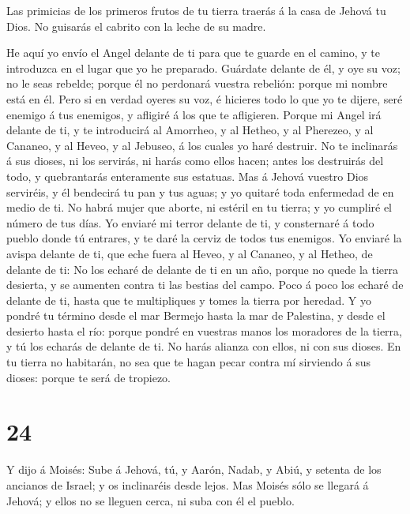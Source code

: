  Las primicias de los primeros frutos de tu tierra traerás
á la casa de Jehová tu Dios. No guisarás el cabrito con la leche de su
madre.

 He aquí yo envío el Angel delante de ti para que te guarde
en el camino, y te introduzca en el lugar que yo he preparado.
 Guárdate delante de él, y oye su voz; no le seas rebelde;
porque él no perdonará vuestra rebelión: porque mi nombre está en él.
 Pero si en verdad oyeres su voz, é hicieres todo lo que yo
te dijere, seré enemigo á tus enemigos, y afligiré á los que te
afligieren.  Porque mi Angel irá delante de ti, y te
introducirá al Amorrheo, y al Hetheo, y al Pherezeo, y al Cananeo, y al
Heveo, y al Jebuseo, á los cuales yo haré destruir.  No te
inclinarás á sus dioses, ni los servirás, ni harás como ellos hacen;
antes los destruirás del todo, y quebrantarás enteramente sus estatuas.
 Mas á Jehová vuestro Dios serviréis, y él bendecirá tu pan
y tus aguas; y yo quitaré toda enfermedad de en medio de ti.
 No habrá mujer que aborte, ni estéril en tu tierra; y yo
cumpliré el número de tus días.  Yo enviaré mi terror
delante de ti, y consternaré á todo pueblo donde tú entrares, y te daré
la cerviz de todos tus enemigos.  Yo enviaré la avispa
delante de ti, que eche fuera al Heveo, y al Cananeo, y al Hetheo, de
delante de ti:  No los echaré de delante de ti en un año,
porque no quede la tierra desierta, y se aumenten contra ti las bestias
del campo.  Poco á poco los echaré de delante de ti, hasta
que te multipliques y tomes la tierra por heredad.  Y yo
pondré tu término desde el mar Bermejo hasta la mar de Palestina, y
desde el desierto hasta el río: porque pondré en vuestras manos los
moradores de la tierra, y tú los echarás de delante de ti. 
No harás alianza con ellos, ni con sus dioses.  En tu
tierra no habitarán, no sea que te hagan pecar contra mí sirviendo á sus
dioses: porque te será de tropiezo.

\hypertarget{section-23}{%
\section{24}\label{section-23}}

 Y dijo á Moisés: Sube á Jehová, tú, y Aarón, Nadab, y Abiú,
y setenta de los ancianos de Israel; y os inclinaréis desde lejos.
 Mas Moisés sólo se llegará á Jehová; y ellos no se lleguen
cerca, ni suba con él el pueblo.

